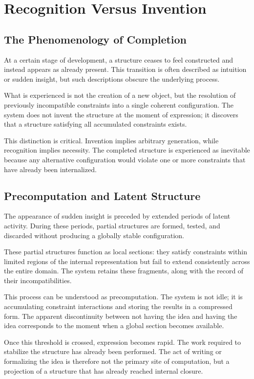 \documentclass[11pt]{article}
\theoremstyle{plain}
\theoremstyle{definition}
\theoremstyle{remark}
\begin{document}
\section{Recognition Versus Invention}

\subsection{The Phenomenology of Completion}

At a certain stage of development, a structure ceases to feel constructed
and instead appears as already present. This transition is often described
as intuition or sudden insight, but such descriptions obscure the underlying
process.

What is experienced is not the creation of a new object, but the resolution
of previously incompatible constraints into a single coherent configuration.
The system does not invent the structure at the moment of expression; it
discovers that a structure satisfying all accumulated constraints exists.

This distinction is critical. Invention implies arbitrary generation,
while recognition implies necessity. The completed structure is experienced
as inevitable because any alternative configuration would violate one or
more constraints that have already been internalized.

\subsection{Precomputation and Latent Structure}

The appearance of sudden insight is preceded by extended periods of latent
activity. During these periods, partial structures are formed, tested,
and discarded without producing a globally stable configuration.

These partial structures function as local sections: they satisfy constraints
within limited regions of the internal representation but fail to extend
consistently across the entire domain. The system retains these fragments,
along with the record of their incompatibilities.

This process can be understood as precomputation. The system is not idle;
it is accumulating constraint interactions and storing the results in a
compressed form. The apparent discontinuity between not having the idea
and having the idea corresponds to the moment when a global section becomes
available.

Once this threshold is crossed, expression becomes rapid. The work required
to stabilize the structure has already been performed. The act of writing
or formalizing the idea is therefore not the primary site of computation,
but a projection of a structure that has already reached internal closure.
\end{document}
